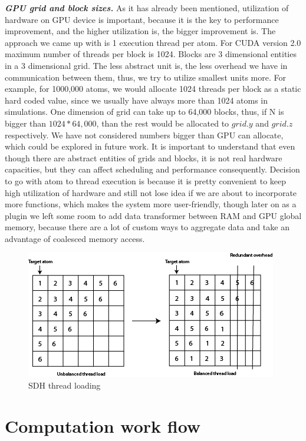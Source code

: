 \documentclass[11pt,a4paper]{report}
\begin{document}
\emph{\textbf{GPU grid and block sizes.}} As it has already been mentioned, utilization of hardware on GPU device is important, because it is the key to performance improvement, and the higher utilization is, the bigger improvement is.
The approach we came up with is 1 execution thread per atom. For CUDA version 2.0 maximum number of threads per block is 1024. Blocks are 3 dimensional entities in a 3 dimensional grid. The less abstract unit is, the less overhead we have in communication between them, thus, we try to utilize smallest units more. For example, for 1000,000 atoms, we would allocate 1024 threads per block as a static hard coded value, since we usually have always more than 1024 atoms in simulations. One dimension of grid can take up to 64,000 blocks, thus, if N is bigger than $1024 * 64,000$, than the rest would be allocated to $grid.y$ and $grid.z$ respectively. We have not considered numbers bigger than GPU can allocate, which could be explored in future work. It is important to understand that even though there are abstract entities of grids and blocks, it is not real hardware capacities, but they can affect scheduling and performance consequently. Decision to go with atom to thread execution is because it is pretty convenient to keep high utilization of hardware and still not lose idea if we are about to incorporate more functions, which makes the system more user-friendly, though later on as a plugin we left some room to add data transformer between RAM and GPU global memory, because there are a lot of custom ways to aggregate data and take an advantage of coalesced memory access.

\begin{figure}
 \centerline{ \includegraphics[width=0.5\columnwidth]{images/threadload} }
 \caption{SDH thread loading}
 \label{fg:threadload}
\end{figure}



\section{Computation work flow}
\end{document}
